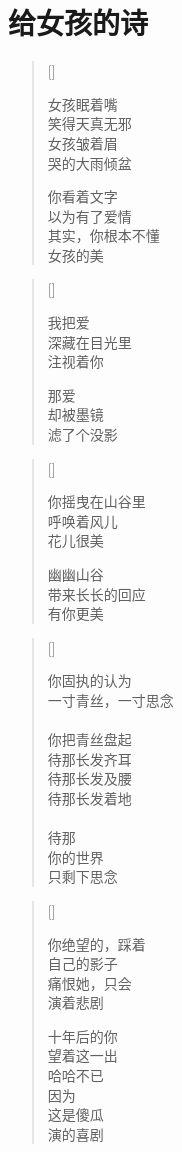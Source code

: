 \chapter{给女孩的诗}
\thispagestyle{empty}
\renewcommand{\poemtoc}{section}
\settowidth{\versewidth}{女孩眠着嘴}
\begin{verse}[\versewidth]

女孩眠着嘴\\
笑得天真无邪\\
女孩皱着眉\\
哭的大雨倾盆

你看着文字\\
以为有了爱情\\
其实，你根本不懂\\
女孩的美
\end{verse}

\settowidth{\versewidth}{女孩眠着嘴}
\begin{verse}[\versewidth]

我把爱\\
深藏在目光里\\
注视着你

那爱\\
却被墨镜\\
滤了个没影
\end{verse}

\settowidth{\versewidth}{女孩眠着嘴}
\begin{verse}[\versewidth]

你摇曳在山谷里\\
呼唤着风儿\\
花儿很美

幽幽山谷\\
带来长长的回应\\
有你更美
\end{verse}
\newpage

\settowidth{\versewidth}{你绝望的，踩着}
\begin{verse}[\versewidth]

你固执的认为\\
一寸青丝，一寸思念\\
~\\
你把青丝盘起\\
待那长发齐耳\\
待那长发及腰\\
待那长发着地\\
~\\
待那\\
你的世界\\
只剩下思念



\end{verse}

\settowidth{\versewidth}{你绝望的，踩着}
\begin{verse}[\versewidth]

你绝望的，踩着\\
自己的影子\\
痛恨她，只会\\
演着悲剧

十年后的你\\
望着这一出\\
哈哈不已\\
因为\\
这是傻瓜\\
演的喜剧
\end{verse}

